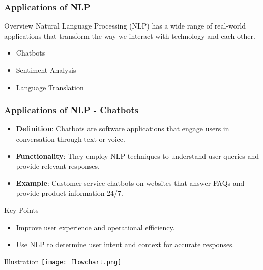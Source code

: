 \documentclass[aspectratio=169]{beamer}
\begin{document}
\begin{frame}
    \frametitle{Applications of NLP}
    \begin{block}{Overview}
        Natural Language Processing (NLP) has a wide range of real-world applications that transform the way we interact with technology and each other. 
    \end{block}
    \begin{itemize}
        \item Chatbots
        \item Sentiment Analysis
        \item Language Translation
    \end{itemize}
\end{frame}

\begin{frame}[fragile]
    \frametitle{Applications of NLP - Chatbots}
    \begin{itemize}
        \item \textbf{Definition}: Chatbots are software applications that engage users in conversation through text or voice.
        \item \textbf{Functionality}: They employ NLP techniques to understand user queries and provide relevant responses.
        \item \textbf{Example}: Customer service chatbots on websites that answer FAQs and provide product information 24/7.
    \end{itemize}
    \begin{block}{Key Points}
        \begin{itemize}
            \item Improve user experience and operational efficiency.
            \item Use NLP to determine user intent and context for accurate responses.
        \end{itemize}
    \end{block}
    \begin{block}{Illustration}
        \centering
        \texttt{[image: flowchart.png]}  %
    \end{block}
\end{frame}
\end{document}
